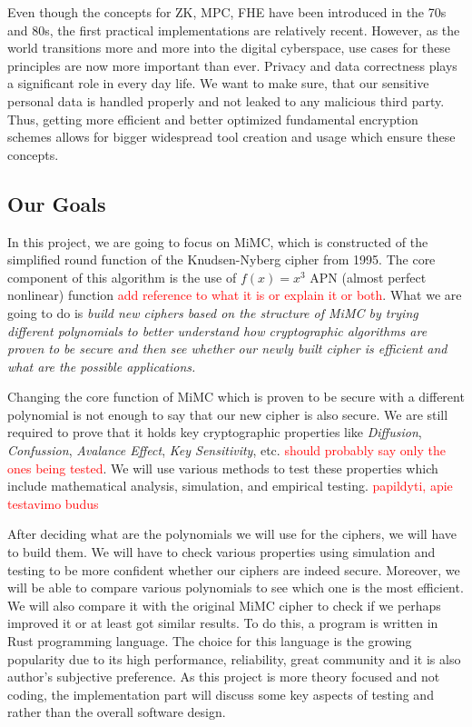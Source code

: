 \documentclass{Resources/UoBLab1}
\theoremstyle{definition}
\begin{document}
Even though the concepts for ZK, MPC, FHE have been introduced in the 70s and 80s, the first practical implementations are relatively recent. However, as the world transitions more and more into the digital cyberspace, use cases for these principles are now more important than ever. Privacy and data correctness plays a significant role in every day life. We want to make sure, that our sensitive personal data is handled properly and not leaked to any malicious third party. Thus, getting more efficient and better optimized fundamental encryption schemes allows for bigger widespread tool creation and usage which ensure these concepts.

\subsection{Our Goals}
In this project, we are going to focus on MiMC, which is constructed of the simplified round function of the Knudsen-Nyberg cipher from 1995\cite{KNCipher}. The core component of this algorithm is the use of \(f(x)=x^3\) APN (almost perfect nonlinear) function \textcolor{red}{add reference to what it is or explain it or both}. What we are going to do is \textit{build new ciphers based on the structure of MiMC by trying different polynomials to better understand how cryptographic algorithms are proven to be secure and then see whether our newly built cipher is efficient and what are the possible applications.}

Changing the core function of MiMC which is proven to be secure with a different polynomial is not enough to say that our new cipher is also secure. We are still required to prove that it holds key cryptographic properties like \textit{Diffusion}, \textit{Confussion}, \textit{Avalance Effect}, \textit{Key Sensitivity}, etc. \textcolor{red}{should probably say only the ones being tested}. We will use various methods to test these properties which include mathematical analysis, simulation, and empirical testing. \textcolor{red}{papildyti, apie testavimo budus}

After deciding what are the polynomials we will use for the ciphers, we will have to build them. We will have to check various properties using simulation and testing to be more confident whether our ciphers are indeed secure. Moreover, we will be able to compare various polynomials to see which one is the most efficient. We will also compare it with the original MiMC cipher to check if we perhaps improved it or at least got similar results. To do this, a program is written in Rust programming language. The choice for this language is the growing popularity due to its high performance, reliability, great community and it is also author's subjective preference. As this project is more theory focused and not coding, the implementation part will discuss some key aspects of testing and rather than the overall software design.
\end{document}
